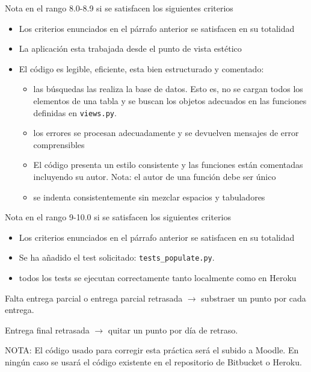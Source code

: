 \documentclass[12pt]{article} %
\newcommand{\views}{\texttt{views.py}}%
\begin{document}
Nota en el rango 8.0-8.9 si se satisfacen los siguientes criterios
 \begin{itemize}
 \item Los criterios enunciados en el párrafo anterior se satisfacen en su totalidad
 \item La aplicación esta trabajada desde el punto de vista estético
 \item El código es legible, eficiente, esta bien estructurado y comentado:
    \begin{itemize}
        \item  las búsquedas las realiza la base de datos. Esto es, no se cargan todos los elementos de una tabla y se buscan los objetos adecuados en las funciones definidas en \views.
        \item  los errores se procesan adecuadamente y se devuelven mensajes de error comprensibles
        \item  El código presenta un estilo consistente y las funciones están comentadas incluyendo su autor. Nota: el autor de una función debe ser único
        \item se indenta consistentemente sin mezclar espacios y tabuladores
    \end{itemize}
\end{itemize}

Nota en el rango 9-10.0 si se satisfacen los siguientes criterios
 \begin{itemize}
 \item Los criterios enunciados en el párrafo anterior se satisfacen en su totalidad 
 \item Se ha añadido el test solicitado: \texttt{tests\_populate.py}.
 \item todos los tests se ejecutan correctamente tanto localmente como en Heroku
\end{itemize}

 Falta entrega parcial o entrega parcial retrasada $\rightarrow$ substraer un punto por cada entrega. 
 
 Entrega final retrasada $\rightarrow$ quitar un punto por día de retraso.

 NOTA: El código usado para corregir esta práctica será el subido a Moodle. En ningún caso se usará el código existente en el repositorio de Bitbucket o Heroku. 
\end{document}
